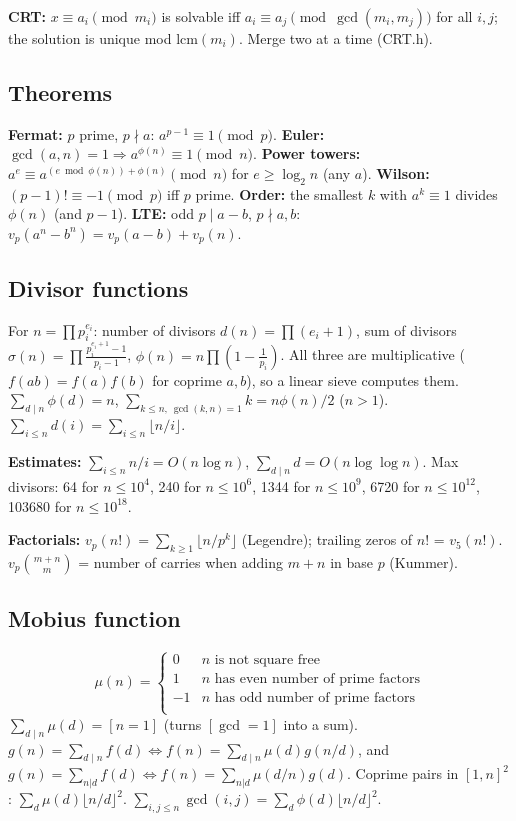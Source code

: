 \textbf{CRT:} $x\equiv a_i \pmod{m_i}$ is solvable iff $a_i\equiv a_j \pmod{\gcd(m_i,m_j)}$ for all
$i,j$; the solution is unique mod $\text{lcm}(m_i)$. Merge two at a time (CRT.h).

\subsection{Theorems}
\textbf{Fermat:} $p$ prime, $p\nmid a$: $a^{p-1}\equiv1 \pmod p$.
\textbf{Euler:} $\gcd(a,n)=1 \Rightarrow a^{\phi(n)}\equiv 1 \pmod n$.
\textbf{Power towers:} $a^{e} \equiv a^{(e \bmod \phi(n)) + \phi(n)} \pmod n$ for $e \ge \log_2 n$
(any $a$). \textbf{Wilson:} $(p-1)!\equiv -1 \pmod p$ iff $p$ prime.
\textbf{Order:} the smallest $k$ with $a^k\equiv1$ divides $\phi(n)$ (and $p-1$).
\textbf{LTE:} odd $p \mid a-b$, $p\nmid a, b$: $v_p(a^n-b^n)=v_p(a-b)+v_p(n)$.

\subsection{Divisor functions}
For $n=\prod p_i^{e_i}$: number of divisors $d(n)=\prod(e_i+1)$, sum of divisors
$\sigma(n)=\prod\frac{p_i^{e_i+1}-1}{p_i-1}$, $\phi(n) = n\prod(1-\frac1{p_i})$.
All three are multiplicative ($f(ab)=f(a)f(b)$ for coprime $a, b$), so a linear sieve
computes them. $\sum_{d\mid n}\phi(d) = n$,
$\sum_{k\le n,\ \gcd(k,n)=1} k = n\phi(n)/2$ ($n>1$). $\sum_{i\le n} d(i) = \sum_{i \le n}\lfloor n/i\rfloor$.

\textbf{Estimates:} $\sum_{i\le n} n/i = O(n\log n)$, $\sum_{d\mid n} d = O(n \log\log n)$.
Max divisors: 64 for $n\le10^4$, 240 for $n\le10^6$, 1344 for $n\le10^9$,
6720 for $n\le10^{12}$, 103680 for $n\le10^{18}$.

\textbf{Factorials:} $v_p(n!) = \sum_{k\ge1}\lfloor n/p^k\rfloor$ (Legendre); trailing zeros of
$n!$ = $v_5(n!)$. $v_p\binom{m+n}{m}$ = number of carries when adding $m+n$ in base $p$ (Kummer).

\subsection{Mobius function}
\[
	\mu(n) = \begin{cases} 0 & n \textrm{ is not square free}\\ 1 & n \textrm{ has even number of prime factors}\\ -1 & n \textrm{ has odd number of prime factors}\\\end{cases}
\]
$\sum_{d\mid n}\mu(d) = [n=1]$ (turns $[\gcd = 1]$ into a sum).
$g(n)=\sum_{d\mid n}f(d) \Leftrightarrow f(n)=\sum_{d\mid n}\mu(d)g(n/d)$, and
$g(n) = \sum_{n|d} f(d) \Leftrightarrow f(n) = \sum_{n|d} \mu(d/n)g(d)$.
Coprime pairs in $[1,n]^2$: $\sum_d \mu(d)\lfloor n/d\rfloor^2$.
$\sum_{i,j\le n}\gcd(i,j) = \sum_d \phi(d)\lfloor n/d\rfloor^2$.

